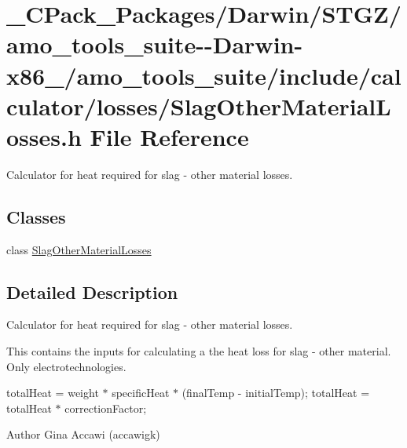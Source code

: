 \hypertarget{___c_pack___packages_2_darwin_2_s_t_g_z_2amo__tools__suite--_darwin-x86__64_2amo__tools__suite_2dc0a6fddc3bab53e61620aff16484645}{}\section{\+\_\+\+C\+Pack\+\_\+\+Packages/\+Darwin/\+S\+T\+G\+Z/amo\+\_\+tools\+\_\+suite-\/-\/\+Darwin-\/x86\+\_/amo\+\_\+tools\+\_\+suite/include/calculator/losses/\+Slag\+Other\+Material\+Losses.h File Reference}
\label{___c_pack___packages_2_darwin_2_s_t_g_z_2amo__tools__suite--_darwin-x86__64_2amo__tools__suite_2dc0a6fddc3bab53e61620aff16484645}


Calculator for heat required for slag -\/ other material losses.  


\subsection*{Classes}
\begin{DoxyCompactItemize}
\item 
class \hyperlink{class_slag_other_material_losses}{Slag\+Other\+Material\+Losses}
\end{DoxyCompactItemize}


\subsection{Detailed Description}
Calculator for heat required for slag -\/ other material losses. 

This contains the inputs for calculating a the heat loss for slag -\/ other material. Only electrotechnologies.

total\+Heat = weight $\ast$ specific\+Heat $\ast$ (final\+Temp -\/ initial\+Temp); total\+Heat = total\+Heat $\ast$ correction\+Factor;

\begin{DoxyAuthor}{Author}
Gina Accawi (accawigk) 
\end{DoxyAuthor}
